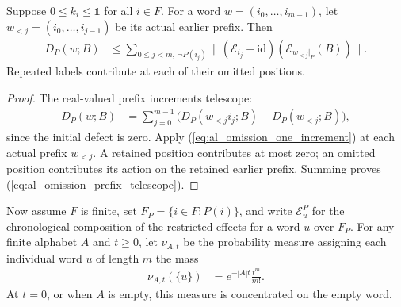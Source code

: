 \begin{theorem}
    \label{thm:al_channel_word_omission_telescope}
    \leanok
    Suppose $0\le k_i\le\mathbb 1$ for all $i\in F$.
    For a word $w=(i_0,\ldots,i_{m-1})$, let
    $w_{<j}=(i_0,\ldots,i_{j-1})$ be its actual earlier prefix.
    Then
    \begin{align}
        \label{eq:al_omission_prefix_telescope}
        D_P(w;B) & \le
        \sum_{0\le j<m,\ \neg P(i_j)}
        \|(\mathcal E_{i_j}-\mathrm{id})
        (\mathcal E_{w_{<j}|_P}(B))\|.
    \end{align}
    Repeated labels contribute at each of their omitted positions.
\end{theorem}
\begin{proof}
    \leanok
    The real-valued prefix increments telescope:
    \begin{align}
        \label{eq:al_omission_real_telescope}
        D_P(w;B) & =
        \sum_{j=0}^{m-1}
        \bigl(D_P(w_{<j}i_j;B)-D_P(w_{<j};B)\bigr),
    \end{align}
    since the initial defect is zero. Apply
    (\ref{eq:al_omission_one_increment}) at each actual prefix
    $w_{<j}$. A retained position contributes at most zero; an
    omitted position contributes its action on the retained
    earlier prefix. Summing proves
    (\ref{eq:al_omission_prefix_telescope}).
\end{proof}

Now assume $F$ is finite, set $F_P=\{i\in F:P(i)\}$, and write
$\mathcal E_u^P$ for the chronological composition of the
restricted effects for a word $u$ over $F_P$. For any finite
alphabet $A$ and $t\ge0$, let $\nu_{A,t}$ be the probability
measure assigning each individual word $u$ of length $m$ the mass
\begin{align}
    \label{eq:al_omission_word_mass}
    \nu_{A,t}(\{u\}) & =e^{-|A|t}\frac{t^m}{m!}.
\end{align}
At $t=0$, or when $A$ is empty, this measure is concentrated on
the empty word.

